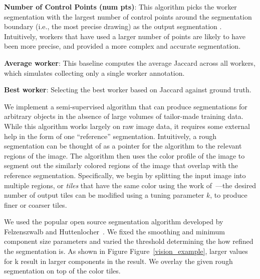 \par \noindent\textbf{Number of Control Points (num pts)}: This algorithm picks the worker segmentation with the largest number of control points around the segmentation boundary (i.e., the most precise drawing) as the output segmentation \cite{Vittayakorn2011,Sorokin2008}. Intuitively, workers that have used a larger number of points are likely to have been more precise, and provided a more complex and accurate segmentation. 
\par \noindent\textbf{Average worker}: This baseline computes the average Jaccard across all workers, which simulates collecting only a single worker annotation.
\par \noindent\textbf{Best worker}: Selecting the best worker based on Jaccard against ground truth. 


\par We implement a semi-supervised algorithm that can produce segmentations for arbitrary objects in the absence of large volumes of tailor-made training data. While this algorithm works largely on raw image data, it requires some external help in the form of one ``reference'' segmentation. Intuitively, a rough segmentation can be thought of as a pointer for the algorithm to the relevant regions of the image. The algorithm then uses the color profile of the image to segment out the similarly colored regions of the image that overlap with the reference segmentation. Specifically, we begin by splitting the input image into multiple regions, or {\em tiles} that have the same color using the work of~\cite{felzenszwalb2004efficient}---the desired number of output tiles can be modified using a tuning parameter $k$, to produce finer or coarser tiles.

We used the popular open source segmentation algorithm developed by Felzenszwalb and Huttenlocher~\cite{felzenszwalb2004efficient}. We fixed the smoothing and minimum component size parameters and varied the threshold determining the how refined the segmentation is. As shown in Figure Figure~\ref{vision_example}, larger values for k result in larger components in the result. We overlay the given rough segmentation on top of the color tiles.

